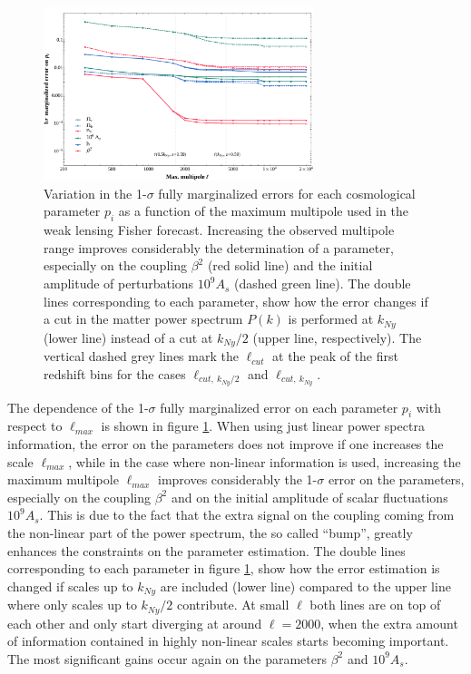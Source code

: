 \begin{figure}[h]
\centering{}\includegraphics[width=0.7\textwidth]{Chapters/fitting-funcs/figures/ellMaxVariation-Nonlinear-New-SmoothX-Version6-pkCut1-2-WL}
\caption[Effect on the 1$\sigma$ errors for the CDE model as a function of sampled scale in a WL forecast.]{\label{fig:WL-lmax-variation} 
Variation in the 1-$\sigma$ fully
marginalized errors for each cosmological parameter $p_{i}$ as a
function of the maximum multipole used in the weak lensing Fisher
forecast. Increasing the observed multipole range improves considerably
the determination of a parameter, especially on the coupling $\beta^{2}$
(red solid line) and the initial amplitude of perturbations $10^{9}A_{s}$
(dashed green line). The double lines corresponding to each parameter,
show how the error changes if a cut in the matter power spectrum $P(k)$
is performed at $k_{Ny}$ (lower line) instead of a cut at $k_{Ny}/2$
(upper line, respectively). The vertical dashed grey lines mark the
$\ell_{cut}$ at the peak of the first redshift bins for the cases
$\ell_{cut,\: k_{Ny}/2}$ and $\ell_{cut,\: k_{Ny}}$.}
\end{figure}


The dependence of the 1-$\sigma$ fully marginalized error on each
parameter $p_{i}$ with respect to $\ell_{max}$ is shown in figure
\ref{fig:WL-lmax-variation}. When using just linear power spectra
information, the error on the parameters does not improve if one increases
the scale $\ell_{max}$, while in the case where non-linear information
is used, increasing the maximum multipole $\ell_{max}$ improves considerably
the 1-$\sigma$ error on the parameters, especially on the coupling
$\beta^{2}$ and on the initial amplitude of scalar fluctuations $10^{9}A_{s}$.
This is due to the fact that the extra signal on the coupling coming
from the non-linear part of the power spectrum, the so called ``bump'',
greatly enhances the constraints on the parameter estimation. The
double lines corresponding to each parameter in figure \ref{fig:WL-lmax-variation},
show how the error estimation is changed if scales up to $k_{Ny}$
are included (lower line) compared to the upper line where only scales
up to $k_{Ny}/2$ contribute. At small $\ell$ both lines are on top
of each other and only start diverging at around $\ell=2000$, when
the extra amount of information contained in highly non-linear scales
starts becoming important. The most significant gains occur again
on the parameters $\beta^{2}$ and $10^{9}A_{s}$.


